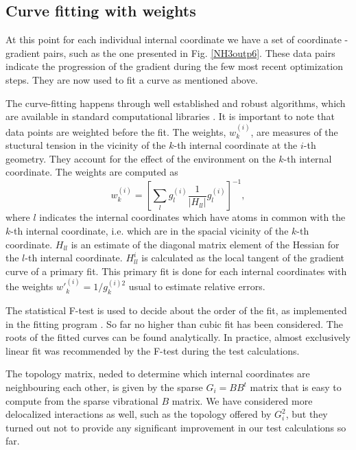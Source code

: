\documentclass[prl,aps,twocolumn,showpacs,twocolumngrid,superbib]{revtex4}
\begin{document}
\subsection{Curve fitting with weights}
At this point for each individual internal coordinate we have a set of 
coordinate - gradient pairs, such as the one presented in 
Fig. \ref{NH3outp6}. These data pairs indicate the progression
of the gradient during the few most recent optimization steps.
They are now used to fit a curve as mentioned above.

The curve-fitting happens through 
well established and robust algorithms, which are available in standard 
computational libraries \cite{slatec}. 
It is important to note
that data points are weighted before the fit. The weights, 
$w_{k}^{(i)}$, are
measures of the stuctural tension in the vicinity of the $k$-th internal
coordinate at the $i$-th geometry. They account for the effect of the 
environment on the $k$-th internal coordinate. 
The weights are computed as
\begin{equation}
w_{k}^{(i)} = \left[ \sum_{l} g_{l}^{(i)} \frac{1}{|H_{ll}^{}|} g_{l}^{(i)} \right]^{-1} ,
\end{equation}
where $l$ indicates the internal coordinates which have atoms in common
with the $k$-th internal coordinate, i.e. which are in the spacial 
vicinity of the $k$-th coordinate. 
$H_{ll}^{}$ is an estimate
of the diagonal matrix element of the Hessian for the $l$-th 
internal coordinate. $H_{ll}^{i}$ is calculated as the local tangent
of the gradient curve of a primary fit. 
This primary fit is done for each internal coordinates with 
the weights $w{'}_{k}^{(i)} = 1/g_{k}^{(i)2}$ usual to 
estimate relative errors.

The statistical F-test is used to decide about the order of the fit,
as implemented in the fitting program \cite{slatec}.
So far no higher than cubic fit has been considered. The roots
of the fitted curves can be found analytically. In practice,
almost exclusively linear fit was recommended by the F-test during
the test calculations.

The topology matrix, neded to determine which internal coordinates
are neighbouring each other, is given by 
the sparse $G_{i}=BB^{t}$ matrix that is easy to compute from the
sparse vibrational $B$ matrix. We have considered more delocalized 
interactions as well, such as the topology offered by $G_i^2$,
but they turned out not to provide any significant improvement in our
test calculations so far.
\end{document}
